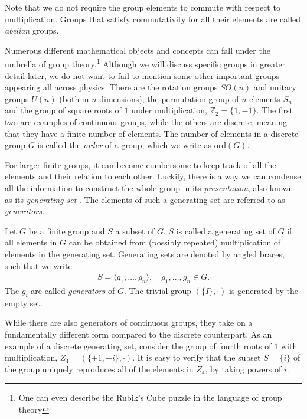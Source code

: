 Note that we do not require the group elements to commute with respect to
multiplication. Groups that satisfy commutativity for all their elements are
called \emph{abelian} groups.

Numerous different mathematical objects and concepts can fall under the
umbrella of group theory.\footnote{One can even describe the Rubik's Cube
puzzle in the language of group theory} Although we will discuss specific
groups in greater detail later, we do not want to fail to mention some other
important groups appearing all across physics. There are the rotation groups
$SO(n)$ and unitary groups $U(n)$ (both in $n$ dimensions), the permutation
group of $n$ elements $S_n$ and the group of square roots of $1$ under
multiplication, $\mathbb{Z}_2 = \{1, -1\}$.  The first two are examples of
continuous groups, while the others are discrete, meaning that they have a
finite number of elements. The number of elements in a discrete group $G$ is
called the \emph{order} of a group, which we write as $\mathrm{ord}(G)$.

For larger finite groups, it can become cumbersome to keep track of all the
elements and their relation to each other. Luckily, there is a way we can
condense all the information to construct the whole group in its
\emph{presentation}, also known as its \emph{generating set}
\cite{zeeGroupTheoryNutshell2016}. The elements of
such a generating set are referred to as \emph{generators}.
\begin{defn}\label{defn:generators}
  Let $G$ be a finite group and $S$ a subset of $G$. $S$ is called a generating
  set of $G$ if all elements in $G$ can be obtained from (possibly repeated)
  multiplication of elements in the generating set. Generating sets are denoted
  by angled braces, such that we write
  \begin{align}
    S = \langle g_1, \ldots, g_n \rangle, \quad g_1,\ldots, g_n \in G
  .\end{align}
  The $g_i$ are called \emph{generators} of $G$. The trivial group $\left(
  \{I\}, \cdot \right)$ is generated by the empty set.
\end{defn}

While there are also generators of continuous groups, they take on a
fundamentally different form compared to the discrete counterpart. As an
example of a discrete generating set, consider the group of fourth roots of $1$
with multiplication, $Z_4 = \left( \{\pm 1,\pm i\}, \cdot \right)$. It is easy
to verify that the subset $S = \{i\}$ of the group uniquely reproduces all of
the elements in $Z_4$, by taking powers of $i$.

